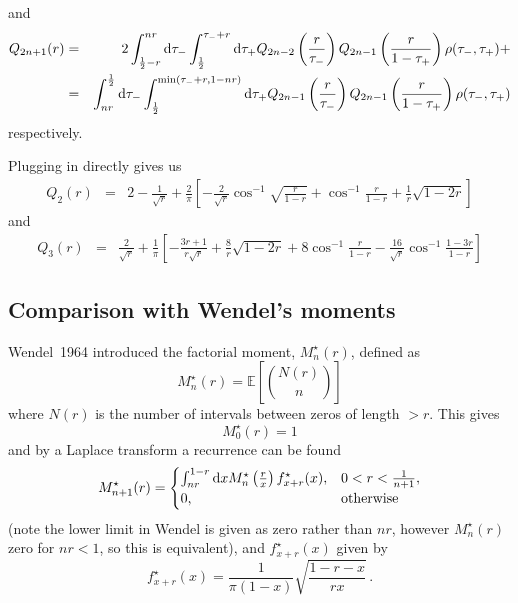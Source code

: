 \documentclass{article}
\newcommand{\tm}{{\tau_{\mathrm{-}}}}
\newcommand{\tp}{{\tau_{\mathrm{+}}}}
\begin{document}
and
\begin{eqnarray}
  Q_{2n+1}(r) &=& 2 \int_{\frac{1}{2}-r}^{nr} {\rm d}\tm \int_{\frac{1}{2}}^{\tm+r} {\rm d}\tp Q_{2n-2}\left(\frac{r}{\tm}\right)Q_{2n-1}\left(\frac{r}{1-\tp}\right)\rho(\tm,\tp) + \nonumber \\
  &=& \int_{nr}^{\frac{1}{2}} {\rm d}\tm \int_{\frac{1}{2}}^{\min(\tm+r,1-nr)} {\rm d}\tp Q_{2n-1}\left(\frac{r}{\tm}\right)Q_{2n-1}\left(\frac{r}{1-\tp}\right)\rho(\tm,\tp)
\end{eqnarray}
respectively.

Plugging in directly gives us
\begin{eqnarray}
  Q_2(r) &=&  2 - \frac{1}{\sqrt{r}} + \frac{2}{\pi}\left[-\frac{2}{\sqrt{r}} \cos^{-1} \sqrt{\frac{r}{1-r}} + \cos^{-1}\frac{r}{1-r} + \frac{1}{r}\sqrt{1-2r}\right] \nonumber
\end{eqnarray}
and
\begin{eqnarray}
  Q_3(r) &=& \frac{2}{\sqrt{r}} + \frac{1}{\pi}\left[-\frac{3r+1}{r\sqrt{r}} + \frac{8}{r}\sqrt{1-2r}  + 8 \cos^{-1} \frac{r}{1-r} - \frac{16}{\sqrt{r}}\cos^{-1}\frac{1-3r}{1-r}\right] \nonumber
\end{eqnarray}
   

\subsection{Comparison with Wendel's moments}
Wendel~1964 introduced the factorial moment, $M^\star_n(r)$, defined as
\begin{equation}
  M^\star_n(r) = \mathbb{E} \left[ {N(r) \choose n} \right]
\end{equation}
where $N(r)$ is the number of intervals between zeros of length $>r$. This gives
\begin{equation}
  M^\star_0(r) = 1
\end{equation}
and by a Laplace transform a recurrence can be found
\begin{equation}
  M^\star_{n+1}(r) = \begin{cases}
    \int_{nr}^{1-r} {\rm d}x M^\star_n\left(\frac{r}{x}\right) f^\star_{x+r}(x), & 0<r<\frac{1}{n+1}, \\
    0, & \text{otherwise}
    \end{cases}
\end{equation}
(note the lower limit in Wendel is given as zero rather than $nr$, however $M^\star_n(r)$ zero for $nr < 1$, so this is equivalent), and $f^\star_{x+r}(x)$ given by
\begin{equation}
  f^\star_{x+r}(x) = \frac{1}{\pi (1-x)} \sqrt{\frac{1-r-x}{rx}} \, .
\end{equation}
\end{document}
